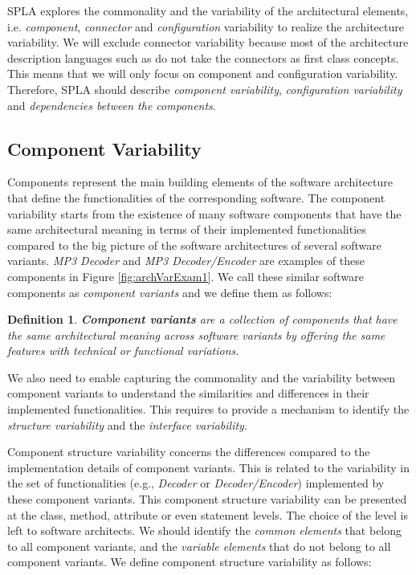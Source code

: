 \documentclass[graybox]{svmult}
\newtheorem{mydef}{Definition}
\begin{document}
SPLA explores the commonality and the variability of the architectural elements, i.e. \textit{component}, \textit{connector} and \textit{configuration} variability to realize the architecture variability. We will exclude connector variability because most of the architecture description languages such as \cite{canal1999specification,luckham1996rapide,magee1996dynamic} do not take the connectors as first class concepts. This means that we will only focus on component and configuration variability. Therefore, SPLA should describe \textit{component variability}, \textit{configuration variability} and \textit{dependencies between the components}.

\subsection{Component Variability}

Components represent the main building elements of the software architecture that define the functionalities of the corresponding software. 
The component variability starts from the existence of many software components that have the same architectural meaning in terms of their implemented functionalities compared to the big picture of the software architectures of several software variants. \textit{MP3 Decoder} and \textit{MP3 Decoder/Encoder} are examples of these components in Figure \ref{fig:archVarExam1}. We call these similar software components as \textit{component variants} and we define them as follows: 

\begin{mydef}
\textbf{Component variants} {are a collection of components that have  the same   architectural meaning across software variants by offering the same features with technical or functional variations.}
\end{mydef} 



We also need to enable capturing the commonality and the variability between component variants to understand the similarities and differences in their  implemented functionalities. This requires to provide a mechanism to identify the \textit{{structure} variability} and the \textit{{interface} variability}.


Component {structure} variability concerns the differences compared to the implementation details of component variants. This is related to the variability in the set of functionalities (e.g., \textit{Decoder} or \textit{Decoder/Encoder}) implemented by these component variants. This component structure variability can be presented at the class, method, attribute or even statement levels. The choice of the level is left to software architects. We should identify the \textit{common elements} that belong to all component variants, and the \textit{variable elements} that do not belong to all component variants. We define component structure variability as follows:
\end{document}

